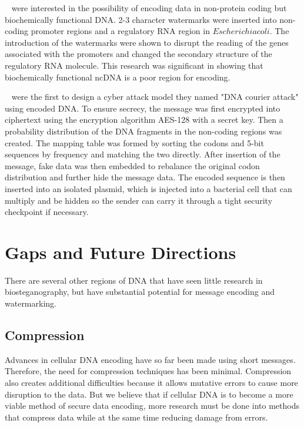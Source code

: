 \documentclass{bioinfo}
\begin{document}
~\cite{HPB2009BMCRN} were interested in the possibility of encoding data in non-protein coding but biochemically functional DNA. 2-3 character watermarks were inserted into non-coding promoter regions and a regulatory RNA region in $Escherichia coli$. The introduction of the watermarks were shown to disrupt the reading of the genes associated with the promoters and changed the secondary structure of the regulatory RNA molecule. This research was significant in showing that biochemically functional ncDNA is a poor region for encoding.

~\cite{CLY2015SAPW} were the first to design a cyber attack model they named "DNA courier attack" using encoded DNA. To ensure secrecy, the message was first encrypted into ciphertext using the encryption algorithm AES-128 with a secret key. Then a probability distribution of the DNA fragments in the non-coding regions was created. The mapping table was formed by sorting the codons and 5-bit sequences by frequency and matching the two directly. After insertion of the message, fake data was then embedded to rebalance the original codon distribution and further hide the message data. The encoded sequence is then inserted into an isolated plasmid, which is injected into a bacterial cell that can multiply and be hidden so the sender can carry it through a tight security checkpoint if necessary.

\section{Gaps and Future Directions}

There are several other regions of DNA that have seen little research in biosteganography, but have substantial potential for message encoding and watermarking.

\subsection{Compression}

Advances in cellular DNA encoding have so far been made using short messages. Therefore, the need for compression techniques has been minimal. Compression also creates additional difficulties because it allows mutative errors to cause more disruption to the data. But we believe that if cellular DNA is to become a more viable method of secure data encoding, more research must be done into methods that compress data while at the same time reducing damage from errors.
\end{document}
